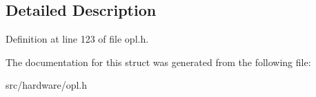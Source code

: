 \subsection{Detailed Description}


Definition at line 123 of file opl.\-h.



The documentation for this struct was generated from the following file\-:\begin{DoxyCompactItemize}
\item 
src/hardware/opl.\-h\end{DoxyCompactItemize}
